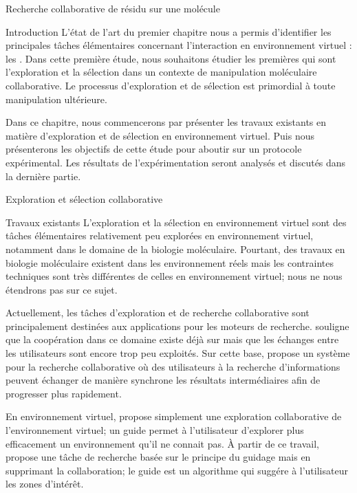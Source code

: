 \documentclass[myfrancais,ngerman,english,french]{mythesis}
\begin{document}
	\begin{mychapter}{Recherche collaborative de résidu sur une molécule}
		\begin{mysection}{Introduction}
			L'état de l'art du premier chapitre nous a permis d'identifier les principales tâches élémentaires concernant l'interaction en environnement virtuel : les .
			Dans cette première étude, nous souhaitons étudier les premières  qui sont l'exploration et la sélection  dans un contexte de manipulation moléculaire collaborative.
			Le processus d'exploration et de sélection est primordial à toute manipulation ultérieure.

			Dans ce chapitre, nous commencerons par présenter les travaux existants en matière d'exploration et de sélection en environnement virtuel.
			Puis nous présenterons les objectifs de cette étude pour aboutir sur un protocole expérimental.
			Les résultats de l'expérimentation seront analysés et discutés dans la dernière partie.
		\end{mysection}
		\begin{mysection}{Exploration et sélection collaborative}
			\begin{mysubsection}{Travaux existants}
				L'exploration et la sélection en environnement virtuel sont des tâches élémentaires relativement peu explorées en environnement virtuel, notamment dans le domaine de la biologie moléculaire.
				Pourtant, des travaux en biologie moléculaire existent dans les environnement réels mais les contraintes techniques sont très différentes de celles en environnement virtuel; nous ne nous étendrons pas sur ce sujet.

				Actuellement, les tâches d'exploration et de recherche collaborative sont principalement destinées aux applications pour les moteurs de recherche.
				 souligne que la coopération dans ce domaine existe déjà sur \myInternet mais que les échanges entre les utilisateurs sont encore trop peu exploités.
				Sur cette base,  propose un système pour la recherche collaborative où des utilisateurs à la recherche d'informations peuvent échanger de manière synchrone les résultats intermédiaires afin de progresser plus rapidement.

				En environnement virtuel,  propose simplement une exploration collaborative de l'environnement virtuel; un guide permet à l'utilisateur d'explorer plus efficacement un environnement qu'il ne connait pas.
				À partir de ce travail,  propose une tâche de recherche basée sur le principe du guidage mais en supprimant la collaboration; le guide est un algorithme qui suggére à l'utilisateur les zones d'intérêt.


\end{mysubsection}
\end{mysection}
\end{mychapter}
\end{document}
